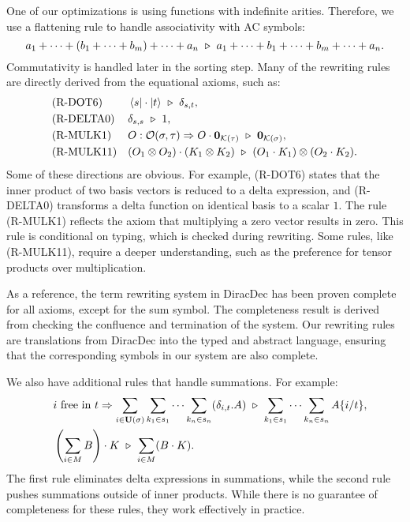 \documentclass[runningheads]{llncs}
\begin{document}
One of our optimizations is using functions with indefinite arities. 
Therefore, we use a flattening rule to handle associativity with AC symbols:
\[
a_1 + \cdots + (b_1 + \cdots + b_m) + \cdots + a_n \ \triangleright\ a_1 + \cdots + b_1 + \cdots + b_m + \cdots + a_n.
\]
Commutativity is handled later in the sorting step. Many of the rewriting rules are directly derived from the equational axioms, such as:
\begin{align*}
    & \textrm{(R-DOT6)} && \bra{s} \cdot \ket{t} \ \reduce\  \delta_{s, t}, \\
    & \textrm{(R-DELTA0)} && \delta_{s, s} \ \reduce\  1, \\
    & \textrm{(R-MULK1)} && O : \OType(\sigma, \tau) \Rightarrow O \cdot \mathbf{0}_{\KType(\tau)} \ \reduce\  \mathbf{0}_{\KType(\sigma)}, \\
    & \textrm{(R-MULK11)} && (O_1 \otimes O_2) \cdot (K_1 \otimes K_2) \ \reduce\  (O_1 \cdot K_1) \otimes (O_2 \cdot K_2).
\end{align*}
Some of these directions are obvious. For example, (R-DOT6) states that the inner product of two basis vectors is reduced to a delta expression, and (R-DELTA0) transforms a delta function on identical basis to a scalar \( 1 \). The rule (R-MULK1) reflects the axiom that multiplying a zero vector results in zero. This rule is conditional on typing, which is checked during rewriting. Some rules, like (R-MULK11), require a deeper understanding, such as the preference for tensor products over multiplication.

As a reference, the term rewriting system in DiracDec has been proven complete for all axioms, except for the sum symbol. The completeness result is derived from checking the confluence and termination of the system. Our rewriting rules are translations from DiracDec into the typed and abstract language, ensuring that the corresponding symbols in our system are also complete.

We also have additional rules that handle summations. For example:
\begin{align*}
    & \quad i \text{ free in } t \Rightarrow \sum_{i \in \mathbf{U}(\sigma)} \sum_{k_1 \in s_1} \cdots \sum_{k_n \in s_n} (\delta_{i, t}.A) \ \reduce\  \sum_{k_1 \in s_1} \cdots \sum_{k_n \in s_n} A\{i/t\}, \\
    & \quad \left( \sum_{i \in M} B \right) \cdot K \ \reduce\  \sum_{i \in M} (B \cdot K).
\end{align*}
The first rule eliminates delta expressions in summations, while the second rule pushes summations outside of inner products. While there is no guarantee of completeness for these rules, they work effectively in practice.
\end{document}
